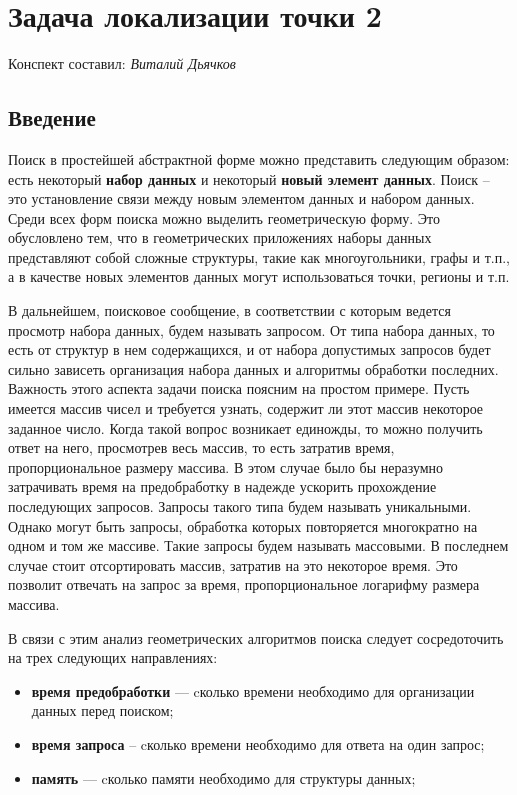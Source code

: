 \section{Задача локализации точки 2}
\begin{center}
    Конспект составил: \textit{Виталий Дьячков}
\end{center}

\subsection{Введение}

Поиск в простейшей абстрактной форме можно представить следующим образом: есть некоторый \textbf{набор данных} и некоторый \textbf{новый элемент данных}. Поиск – это установление связи между новым элементом данных и набором данных. Среди всех форм поиска можно выделить геометрическую форму. Это обусловлено тем, что в геометрических приложениях наборы данных представляют собой сложные структуры, такие как многоугольники, графы и т.п., а в качестве новых элементов данных могут использоваться точки, регионы и т.п.

В дальнейшем, поисковое сообщение, в соответствии с которым ведется просмотр набора данных, будем называть запросом. От типа набора данных, то есть от структур в нем содержащихся, и от набора допустимых запросов будет сильно зависеть организация набора данных и алгоритмы обработки последних. Важность этого аспекта задачи поиска поясним на простом примере. Пусть имеется массив чисел и требуется узнать, содержит ли этот массив некоторое заданное число. Когда такой вопрос возникает единожды, то можно получить ответ на него, просмотрев весь массив, то есть затратив время, пропорциональное размеру массива. В этом случае было бы неразумно затрачивать время на предобработку в надежде ускорить прохождение последующих запросов. Запросы такого типа будем называть уникальными. Однако могут быть запросы, обработка которых повторяется многократно на одном и том же массиве. Такие запросы будем называть массовыми. В последнем случае стоит отсортировать массив, затратив на это некоторое время. Это позволит отвечать на запрос за время, пропорциональное логарифму размера массива.

В связи с этим анализ геометрических алгоритмов поиска следует сосредоточить на трех следующих направлениях:
\begin{itemize}
    \item \textbf{время предобработки} --- cколько времени необходимо для организации данных перед поиском;
    \item \textbf{время запроса} -- cколько времени необходимо для ответа на один запрос;
    \item \textbf{память} --- cколько памяти необходимо для структуры данных;
\end{itemize}

